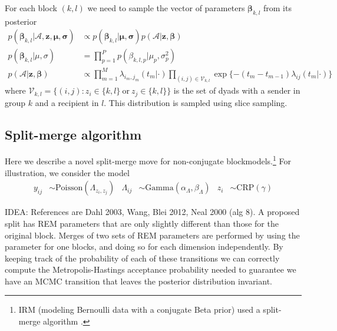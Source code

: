 \documentclass{article}
\begin{document}
For each block $(k,l)$ we need to sample the vector of parameters $\boldsymbol{\beta}_{k,l}$ from its posterior
\begin{align*}
p(\boldsymbol{\beta}_{k,l} | \mathcal{A}, \textbf{z}, \boldsymbol{\mu}, \boldsymbol{\sigma}) &\propto p(\boldsymbol{\beta}_{k,l} | \boldsymbol{\mu}, \boldsymbol{\sigma}) p( \mathcal{A}| \textbf{z}, \boldsymbol{\beta}) \\ %
p(\boldsymbol{\beta}_{k,l} | \mu, \sigma) &= \prod_{p=1}^Pp(\beta_{k,l,p}|\mu_p,\sigma_p^2)\\
p(\mathcal{A}|\mathbf{z},\boldsymbol{\beta}) &\propto \prod_{m=1}^M \lambda_{i_m,j_m}(t_m|\cdot)
\prod_{(i,j) \in \mathcal{V}_{k,l}} \exp \{ -(t_m - t_{m-1}) \lambda_{ij}(t_m|\cdot)\}
\end{align*}
where $\mathcal{V}_{k,l} = \{(i,j): z_{i} \in \{k,l\} \ \mbox{or} \ z_{j} \in \{k,l\} \}$ is the set of dyads with a sender in group $k$ and a recipient in $l$.  This distribution is sampled using slice sampling.

\subsection{Split-merge algorithm}


Here we describe a novel split-merge move for non-conjugate blockmodels.\footnote{IRM (modeling Bernoulli data with a conjugate Beta prior) used a split-merge algorithm \cite{Kempe2006}.}  For illustration, we consider the model
\begin{align*}
  y_{ij} & \sim \mbox{Poisson}(\Lambda_{z_i,z_j}) & \Lambda_{ij} &\sim \mbox{Gamma}(\alpha_{\Lambda},\beta_{\Lambda})  & z_i &\sim \mbox{CRP}(\gamma)
\end{align*}

IDEA: References are Dahl 2003, Wang, Blei 2012, Neal 2000 (alg 8).  A proposed split has REM parameters that are only slightly different than those for the original block.  Merges of two sets of REM parameters are performed by using the parameter for one blocks, and doing so for each dimension independently.  By keeping track of the probability of each of these transitions we can correctly compute the Metropolis-Hastings acceptance probability needed to guarantee we have an MCMC transition that leaves the posterior distribution invariant.
\end{document}
